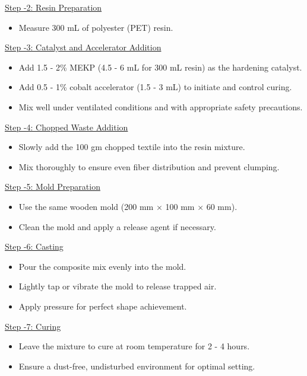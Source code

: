 \noindent\underline{Step -2: Resin Preparation}
\begin{itemize}[leftmargin=1.5cm]
	\item Measure 300 mL of polyester (PET) resin.
\end{itemize}

\noindent\underline{Step -3: Catalyst and Accelerator Addition }
\begin{itemize}[leftmargin=1.5cm]
	\item Add 1.5 - 2\% MEKP (4.5 - 6 mL for 300 mL resin) as the hardening catalyst.
	\item Add 0.5 - 1\% cobalt accelerator (1.5 - 3 mL) to initiate and control curing.
	\item Mix well under ventilated conditions and with appropriate safety precautions.
\end{itemize}

\noindent\underline{Step -4: Chopped Waste Addition }
\begin{itemize}
	\item Slowly add the 100 gm chopped textile into the resin mixture.
	\item Mix thoroughly to ensure even fiber distribution and prevent clumping.
\end{itemize}

\noindent\underline{Step -5: Mold Preparation }
\begin{itemize}[leftmargin=1.5cm]
	\item Use the same wooden mold (200 mm $\times$ 100 mm $\times$ 60 mm).
	\item Clean the mold and apply a release agent if necessary.
\end{itemize}

\noindent\underline{Step -6: Casting}
\begin{itemize}[leftmargin=1.5cm]
	\item Pour the composite mix evenly into the mold.
	\item Lightly tap or vibrate the mold to release trapped air.
	\item Apply pressure for perfect shape achievement.
\end{itemize}

\noindent\underline{Step -7: Curing }
\begin{itemize}[leftmargin=1.5cm]
	\item Leave the mixture to cure at room temperature for 2 - 4 hours.
	\item Ensure a dust-free, undisturbed environment for optimal setting.
\end{itemize}

